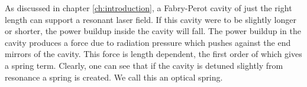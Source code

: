 As discussed in chapter \ref{ch:introduction}, a Fabry-Perot cavity of just the right
length can support a resonant laser field. If this cavity were to be slightly longer or
shorter, the power buildup inside the cavity will fall. The power buildup in the cavity
produces a force due to radiation pressure which pushes against the end mirrors
of the cavity. This force is length dependent, the first order of which gives a spring
term. Clearly, one can see that if the cavity is detuned slightly from resonance a
spring is created. We call this an optical spring.